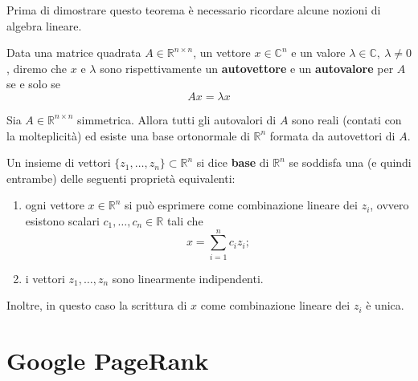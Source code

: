 Prima di dimostrare questo teorema è necessario ricordare alcune nozioni di algebra lineare.

\begin{definizione}
    Data una matrice quadrata $A \in \mathbb{R}^{n\times n}$, un vettore $x \in \mathbb{C}^n$ e un valore $\lambda \in \mathbb{C},\ \lambda \neq 0$, diremo che $x$ e $\lambda$ sono rispettivamente un \textbf{autovettore} e un \textbf{autovalore} per $A$ se e solo se
    \[
        Ax = \lambda x
    \]
\end{definizione}

\begin{teorema}\label{teo:th_rosso}
    Sia \(A\in\mathbb{R}^{n\times n}\) simmetrica. Allora tutti gli autovalori di \(A\) sono reali (contati con la molteplicità) ed esiste una base ortonormale di \(\mathbb{R}^n\) formata da autovettori di \(A\).
\end{teorema}

\begin{definizione}[Base]
    Un insieme di vettori $\{z_1,\dots,z_n\}\subset\mathbb{R}^n$ si dice \textbf{base} di $\mathbb{R}^n$ se soddisfa una (e quindi entrambe) delle seguenti proprietà equivalenti:
    \begin{enumerate}
        \item ogni vettore $x\in\mathbb{R}^n$ si può esprimere come combinazione lineare dei $z_i$, ovvero esistono scalari $c_1,\dots,c_n\in\mathbb{R}$ tali che
        \[
            x=\sum_{i=1}^n c_i z_i;
        \]
        \item i vettori $z_1,\dots,z_n$ sono linearmente indipendenti.
    \end{enumerate}
    Inoltre, in questo caso la scrittura di $x$ come combinazione lineare dei $z_i$ è unica.
\end{definizione}



\section{Google PageRank}